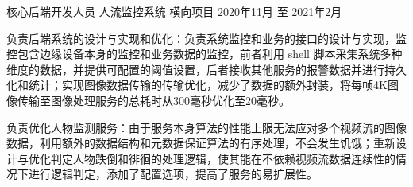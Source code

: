 \begin{cventries}

  \cventry
  {核心后端开发人员} %
  {人流监控系统} %
  {横向项目} %
  {2020年11月 至 2021年2月} %
  {
    \begin{cvitems} %
      \setlength\itemsep{1mm}
      \item {负责后端系统的设计与实现和优化：负责系统监控和业务的接口的设计与实现，监控包含边缘设备本身的监控和业务数据的监控，前者利用 shell 脚本采集系统多种维度的数据，并提供可配置的阈值设置，后者接收其他服务的报警数据并进行持久化和统计；实现图像数据传输的传输优化，减少了数据的额外封装，将每帧4K图像传输至图像处理服务的总耗时从300毫秒优化至20毫秒。}
      \item {负责优化人物监测服务：由于服务本身算法的性能上限无法应对多个视频流的图像数据，利用额外的数据结构和元数据保证算法的有序处理，不会发生饥饿；重新设计与优化判定人物跌倒和徘徊的处理逻辑，使其能在不依赖视频流数据连续性的情况下进行逻辑判定，添加了配置选项，提高了服务的易扩展性。}
    \end{cvitems}
  }


\end{cventries}
